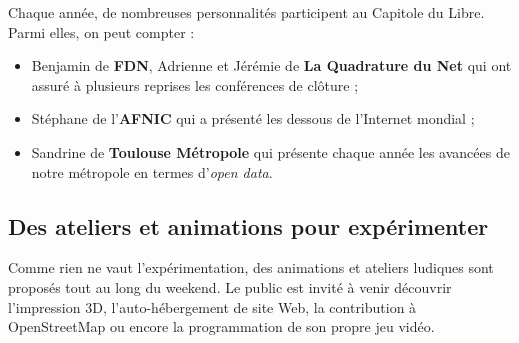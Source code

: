 Chaque année, de nombreuses personnalités participent au Capitole du Libre. Parmi elles, on peut compter :

\begin{itemize}[label=$\bullet$]
\item Benjamin  de \textbf{FDN}, Adrienne  et Jérémie  de \textbf{La Quadrature du Net} qui ont assuré à plusieurs reprises les conférences de clôture ;
\item Stéphane  de l'\textbf{AFNIC} qui a présenté les dessous de l'Internet mondial ;
\item Sandrine  de \textbf{Toulouse Métropole} qui présente chaque année les avancées de notre métropole en termes d'\textit{open data}.
\end{itemize} 

\subsection{Des ateliers et animations pour expérimenter}

\begin{minipage}{0.6\textwidth}

Comme rien ne vaut l'expérimentation, des animations et ateliers ludiques sont proposés tout au long du weekend. Le public est invité à venir découvrir l’impression 3D, l’auto-hébergement de site Web, la contribution à OpenStreetMap ou encore la programmation de son propre jeu vidéo.

\end{minipage}
\begin{minipage}{0.4\textwidth}
\begin{center}
\end{center}
\end{minipage}

